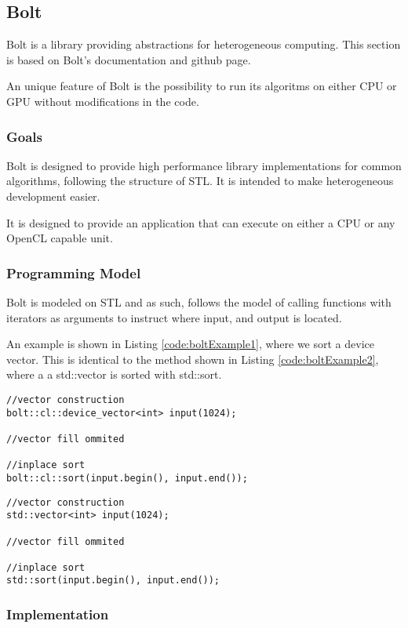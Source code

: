 \subsection{Bolt}
Bolt is a library providing abstractions for heterogeneous computing. This section is based on Bolt's documentation\cite{boltDoc} and github page\cite{boltGithub}.

An unique feature of Bolt is the possibility to run its algoritms on either CPU or GPU without modifications in the code.

\subsubsection{Goals}
Bolt is designed to provide high performance library implementations for common algorithms, following the structure of STL. It is intended to make heterogeneous development easier.

It is designed to provide an application that can execute on either a CPU or any OpenCL capable unit.

\subsubsection{Programming Model}
Bolt is modeled on STL and as such, follows the model of calling functions with iterators as arguments to instruct where input, and output is located.

An example is shown in Listing \ref{code:boltExample1}, where we sort a device vector. This is identical to the method shown in Listing \ref{code:boltExample2}, where a a std::vector is sorted with std::sort.
\begin{lstlisting}[caption={Bolt sort example}, label={code:boltExample1}]
//vector construction
bolt::cl::device_vector<int> input(1024);

//vector fill ommited

//inplace sort
bolt::cl::sort(input.begin(), input.end());
\end{lstlisting}

\begin{lstlisting}[caption={STL sort example}, label={code:boltExample2}]
//vector construction
std::vector<int> input(1024);

//vector fill ommited

//inplace sort
std::sort(input.begin(), input.end());
\end{lstlisting}

\subsubsection{Implementation}

